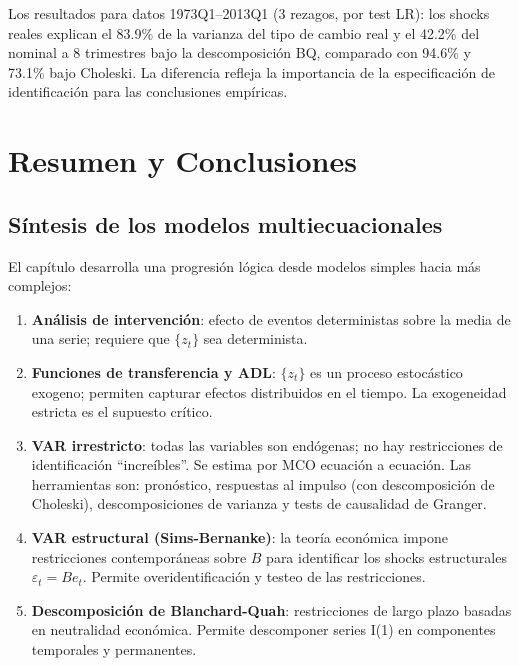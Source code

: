\documentclass[12pt]{article}
\begin{document}
\begin{intuicion}
Los resultados para datos 1973Q1--2013Q1 (3 rezagos, por test LR): los shocks reales explican el 83.9\% de la varianza del tipo de cambio real y el 42.2\% del nominal a 8 trimestres bajo la descomposici\'on BQ, comparado con 94.6\% y 73.1\% bajo Choleski. La diferencia refleja la importancia de la especificaci\'on de identificaci\'on para las conclusiones emp\'iricas.
\end{intuicion}

\section{Resumen y Conclusiones}

\subsection{S\'intesis de los modelos multiecuacionales}

El cap\'itulo desarrolla una progresi\'on l\'ogica desde modelos simples hacia m\'as complejos:

\begin{enumerate}
  \item \textbf{An\'alisis de intervenci\'on}: efecto de eventos deterministas sobre la media de una serie; requiere que $\{z_t\}$ sea determinista.

  \item \textbf{Funciones de transferencia y ADL}: $\{z_t\}$ es un proceso estoc\'astico exogeno; permiten capturar efectos distribuidos en el tiempo. La exogeneidad estricta es el supuesto cr\'itico.

  \item \textbf{VAR irrestricto}: todas las variables son end\'ogenas; no hay restricciones de identificaci\'on ``incre\'ibles''. Se estima por MCO ecuaci\'on a ecuaci\'on. Las herramientas son: pron\'ostico, respuestas al impulso (con descomposici\'on de Choleski), descomposiciones de varianza y tests de causalidad de Granger.

  \item \textbf{VAR estructural (Sims-Bernanke)}: la teor\'ia econ\'omica impone restricciones contempor\'aneas sobre $B$ para identificar los shocks estructurales $\varepsilon_t = Be_t$. Permite overidentificaci\'on y testeo de las restricciones.

  \item \textbf{Descomposici\'on de Blanchard-Quah}: restricciones de largo plazo basadas en neutralidad econ\'omica. Permite descomponer series I(1) en componentes temporales y permanentes.
\end{enumerate}
\end{document}
